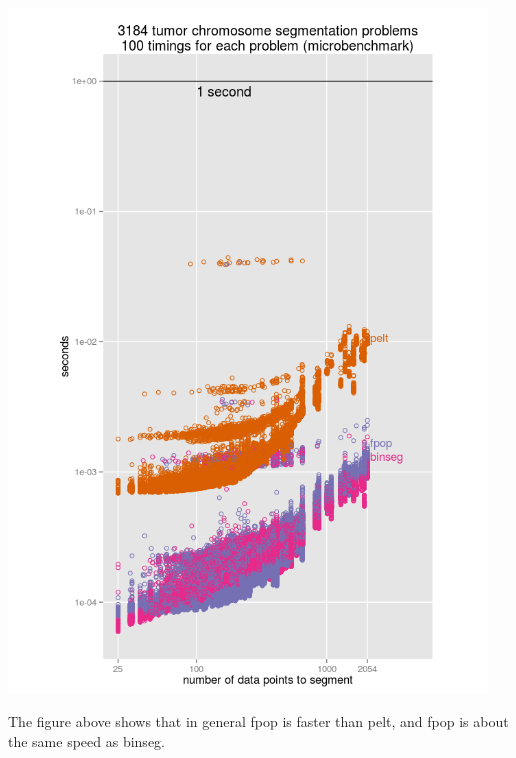 \documentclass{article}
\begin{document}
\begin{center}
  \includegraphics[width=5in]{figure-microbenchmark-arrays}
\end{center}

The figure above shows that in general fpop is faster than pelt, and
fpop is about the same speed as binseg.
\end{document}
